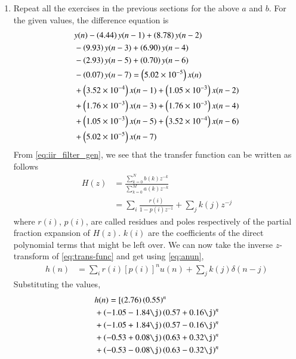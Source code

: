 \documentclass[journal,12pt,twocolumn]{IEEEtran}
\renewcommand\thesection{\arabic{section}}
\begin{document}
\begin{enumerate}[label=\thesection.\arabic*]
	\item Repeat all the exercises in the previous sections for the above $a$ and $b$.
	\solution
	For the given values, the difference equation is
	\begin{align}
		&y(n) - \left(4.44\right)y(n - 1) + \left(8.78\right)y(n - 2) \nonumber \\
		&- \left(9.93\right)y(n - 3) + \left(6.90\right)y(n - 4) \nonumber \\
		&- \left(2.93\right)y(n - 5) \nonumber + \left(0.70\right)y(n - 6) \nonumber \\
		&- \left(0.07\right)y(n - 7) = \left(5.02 \times 10^{-5}\right)x(n) \nonumber \\
		&+ \left(3.52 \times 10^{-4}\right)x(n - 1) + \left(1.05 \times 10^{-3}\right)x(n - 2) \nonumber \\
		&+ \left(1.76 \times 10^{-3}\right)x(n - 3) + \left(1.76 \times 10^{-3}\right)x(n - 4) \nonumber \\
		&+ \left(1.05 \times 10^{-3}\right)x(n - 5) + \left(3.52 \times 10^{-4}\right)x(n - 6) \nonumber \\
		&+ \left(5.02 \times 10^{-5}\right)x(n - 7)
	\end{align}
	From \eqref{eq:iir_filter_gen}, we see that the transfer function can be written as follows
	\begin{align}
		H(z) &= \frac{\sum_{k = 0}^{N}b(k)z^{-k}}{\sum_{k = 0}^{M}a(k)z^{-k}} \\
		&= \sum_{i}\frac{r(i)}{1 - p(i)z^{-1}} + \sum_{j}k(j)z^{-j}
		\label{eq:trans-func}
	\end{align}
	where $r(i)$, $p(i)$, are called residues and poles respectively of the partial 
	fraction expansion of $H(z)$. $k(i)$ are the coefficients of the direct polynomial 
	terms that might be left over. We can now take the inverse $z$-transform of
	\eqref{eq:trans-func} and get using \eqref{eq:anun},
	\begin{align}
		h(n) &= \sum_{i}r(i)[p(i)]^nu(n) + \sum_{j}k(j)\delta(n - j)
		\label{eq:h-n-expr}
	\end{align}
	Substituting the values,
	\begin{align}
		&h(n) = [\brak{2.76}\brak{0.55}^n \nonumber \\ 
		&+ \brak{-1.05-1.84\j}\brak{0.57+0.16\j}^n \nonumber \\
		&+ \brak{-1.05+1.84\j}\brak{0.57-0.16\j}^n \nonumber \\
		&+ \brak{-0.53+0.08\j}\brak{0.63+0.32\j}^n \nonumber \\
		&+ \brak{-0.53-0.08\j}\brak{0.63-0.32\j}^n \nonumber \\

\end{align}
\end{enumerate}
\end{document}

